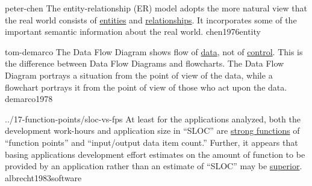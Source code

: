 \documentclass{article}
\begin{document}

\lnQuote
  {peter-chen}
  {The entity-relationship (ER) model adopts the more natural view that the real world consists of \ul{entities} and \ul{relationships}. It incorporates some of the important semantic information about the real world.}
  {chen1976entity}


\lnQuote
  {tom-demarco}
  {The Data Flow Diagram shows flow of \ul{data}, not of \ul{control}. This is the difference between Data Flow Diagrams and flowcharts. The Data Flow Diagram portrays a situation from the point of view of the data, while a flowchart portrays it from the point of view of those who act upon the data.}
  {demarco1978}


\lnQuote
  {../17-function-points/sloc-vs-fps}
  {At least for the applications analyzed, both the development work-hours and application size in ``SLOC'' are \ul{strong functions} of ``function points'' and ``input/output data item count.'' Further, it appears that basing applications development effort estimates on the amount of function to be provided by an application rather than an estimate of ``SLOC'' may be \ul{superior}.}
  {albrecht1983software}
\end{document}
